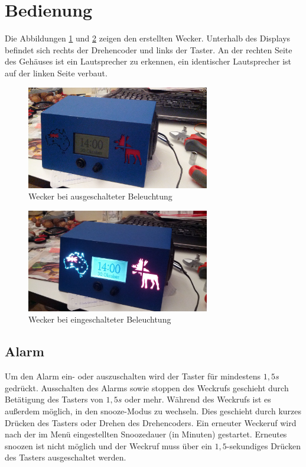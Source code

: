 \documentclass[journal, a4paper]{IEEEtran}
\begin{document}

\section{Bedienung}
Die Abbildungen \ref{fig:wecker1} und \ref{fig:wecker2} zeigen den erstellten Wecker. Unterhalb des Displays befindet sich rechts der Drehencoder und links der Taster. An der rechten Seite des Gehäuses ist ein Lautsprecher zu erkennen, ein identischer Lautsprecher ist auf der linken Seite verbaut.

\begin{figure}
	\begin{center}	
		\includegraphics[width=8cm]{./Grafiken/wecker1.jpeg}
		\caption{Wecker bei ausgeschalteter Beleuchtung}
		\label{fig:wecker1}
	\end{center}
\end{figure}
\begin{figure}
	\begin{center}	
		\includegraphics[width=8cm]{./Grafiken/wecker2.jpeg}
		\caption{Wecker bei eingeschalteter Beleuchtung}
		\label{fig:wecker2}
	\end{center}
\end{figure}

\subsection{Alarm}
Um den Alarm ein- oder auszuschalten wird der Taster für mindestens $1,5s$ gedrückt. Ausschalten des Alarms sowie stoppen des Weckrufs geschieht durch Betätigung des Tasters von $1,5s$ oder mehr. Während des Weckrufs ist es außerdem möglich, in den snooze-Modus zu wechseln. Dies geschieht durch kurzes Drücken des Tasters oder Drehen des Drehencoders. Ein erneuter Weckeruf wird nach der im Menü eingestellten Snoozedauer (in Minuten) gestartet. Erneutes snoozen ist nicht möglich und der Weckruf muss über ein $1,5$-sekundiges Drücken des Tasters ausgeschaltet werden.
\end{document}
